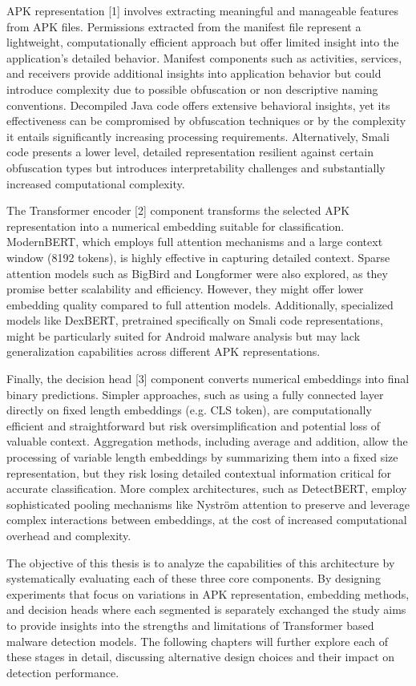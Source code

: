 APK representation [1] involves extracting meaningful and manageable features from APK files. 
Permissions extracted from the manifest file represent a lightweight, 
computationally efficient approach but offer limited insight into the application's detailed behavior. 
Manifest components such as activities, services, and receivers provide additional insights into application behavior 
but could introduce complexity due to possible obfuscation or non descriptive naming conventions. 
Decompiled Java code offers extensive behavioral insights, 
yet its effectiveness can be compromised by obfuscation techniques or by the complexity it entails
significantly increasing processing requirements. 
Alternatively, Smali code presents a lower level, 
detailed representation resilient against certain obfuscation types 
but introduces interpretability challenges and substantially increased computational complexity.

The Transformer encoder [2] component transforms the selected APK representation into a numerical embedding 
suitable for classification. 
ModernBERT, which employs full attention mechanisms and a large context window (8192 tokens), 
is highly effective in capturing detailed context. 
Sparse attention models such as BigBird and Longformer were also explored, 
as they promise better scalability and efficiency.
However, they might offer lower embedding quality compared to full attention models. 
Additionally, specialized models like DexBERT, pretrained specifically on Smali code representations, 
might be particularly suited for Android malware analysis but may lack generalization 
capabilities across different APK representations.

Finally, the decision head [3] component converts numerical embeddings into final binary predictions. 
Simpler approaches, such as using a fully connected layer directly on fixed length embeddings 
(e.g. CLS token), are computationally efficient and straightforward but risk oversimplification and potential 
loss of valuable context. 
Aggregation methods, including average and addition, allow the processing of variable length embeddings by 
summarizing them into a fixed size representation, 
but they risk losing detailed contextual information critical for accurate classification. 
More complex architectures, such as DetectBERT, employ sophisticated pooling mechanisms like 
Nyström attention to preserve and leverage complex interactions between embeddings, 
at the cost of increased computational overhead and complexity.

The objective of this thesis is to analyze the capabilities of 
this architecture by systematically evaluating each of these three 
core components. By designing experiments that focus on variations 
in APK representation, embedding methods, and decision heads
where each segmented is separately exchanged
the study aims to provide insights into the strengths and limitations 
of Transformer based malware detection models. 
The following chapters will further explore each of these stages in detail, 
discussing alternative design choices and their impact on detection performance.
